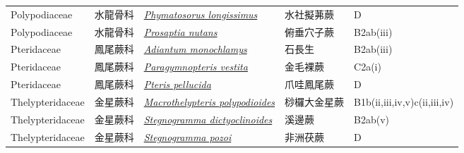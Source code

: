 {\begin{longtable}{p{2.5cm}p{2.5cm}p{4.5cm}p{2.5cm}p{3cm}}
    Polypodiaceae & 水龍骨科 & \href{http://www.theplantlist.org/tpl1.1/search?q=Phymatosorus+longissimus}{\textit{Phymatosorus longissimus} } & 水社擬茀蕨 & D \index{Phymatosorus@\textit{Phymatosorus}!longissimus@\textit{longissimus}}  \index{水社擬茀蕨} \\
    Polypodiaceae & 水龍骨科 & \href{http://www.theplantlist.org/tpl1.1/search?q=Prosaptia+nutans}{\textit{Prosaptia nutans} } & 俯垂穴子蕨 & B2ab(iii) \index{Prosaptia@\textit{Prosaptia}!nutans@\textit{nutans}}  \index{俯垂穴子蕨} \\
    Pteridaceae & 鳳尾蕨科 & \href{http://www.theplantlist.org/tpl1.1/search?q=Adiantum+monochlamys}{\textit{Adiantum monochlamys} } & 石長生 & B2ab(iii) \index{Adiantum@\textit{Adiantum}!monochlamys@\textit{monochlamys}}  \index{石長生} \\
    Pteridaceae & 鳳尾蕨科 & \href{http://www.theplantlist.org/tpl1.1/search?q=Paragymnopteris+vestita}{\textit{Paragymnopteris vestita} } & 金毛裸蕨 & C2a(i) \index{Paragymnopteris@\textit{Paragymnopteris}!vestita@\textit{vestita}}  \index{金毛裸蕨} \\
    Pteridaceae & 鳳尾蕨科 & \href{http://www.theplantlist.org/tpl1.1/search?q=Pteris+pellucida}{\textit{Pteris pellucida} } & 爪哇鳳尾蕨 & D \index{Pteris@\textit{Pteris}!pellucida@\textit{pellucida}}  \index{爪哇鳳尾蕨} \\
    Thelypteridaceae & 金星蕨科 & \href{http://www.theplantlist.org/tpl1.1/search?q=Macrothelypteris+polypodioides}{\textit{Macrothelypteris polypodioides} } & 桫欏大金星蕨 & B1b(ii,iii,iv,v)c(ii,iii,iv) \index{Macrothelypteris@\textit{Macrothelypteris}!polypodioides@\textit{polypodioides}}  \index{桫欏大金星蕨} \\
    Thelypteridaceae & 金星蕨科 & \href{http://www.theplantlist.org/tpl1.1/search?q=Stegnogramma+dictyoclinoides}{\textit{Stegnogramma dictyoclinoides} } & 溪邊蕨 & B2ab(v) \index{Stegnogramma@\textit{Stegnogramma}!dictyoclinoides@\textit{dictyoclinoides}}  \index{溪邊蕨} \\
    Thelypteridaceae & 金星蕨科 & \href{http://www.theplantlist.org/tpl1.1/search?q=Stegnogramma+pozoi}{\textit{Stegnogramma pozoi} } & 非洲茯蕨 & D \index{Stegnogramma@\textit{Stegnogramma}!pozoi@\textit{pozoi}}  \index{非洲茯蕨} \\
    \bottomrule
        \end{longtable}
        }
    